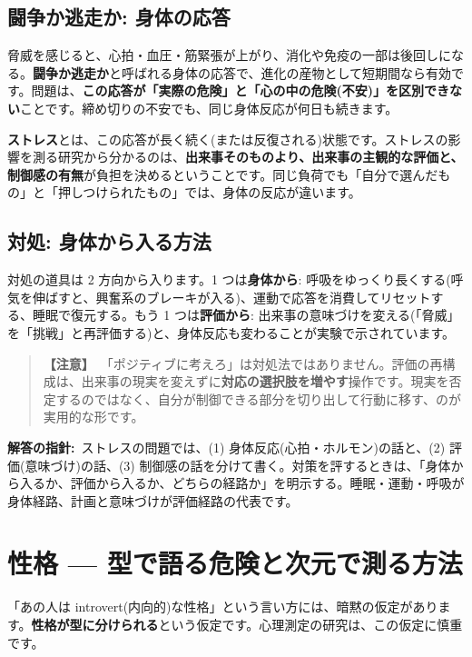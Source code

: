 \documentclass{article}
\begin{document}
\subsection{闘争か逃走か: 身体の応答}

脅威を感じると、心拍・血圧・筋緊張が上がり、消化や免疫の一部は後回しになる。\textbf{闘争か逃走か}と呼ばれる身体の応答で、進化の産物として短期間なら有効です。問題は、\textbf{この応答が「実際の危険」と「心の中の危険(不安)」を区別できない}ことです。締め切りの不安でも、同じ身体反応が何日も続きます。

\textbf{ストレス}とは、この応答が長く続く(または反復される)状態です。ストレスの影響を測る研究から分かるのは、\textbf{出来事そのものより、出来事の主観的な評価と、制御感の有無}が負担を決めるということです。同じ負荷でも「自分で選んだもの」と「押しつけられたもの」では、身体の反応が違います。

\subsection{対処: 身体から入る方法}

対処の道具は 2 方向から入ります。1 つは\textbf{身体から}: 呼吸をゆっくり長くする(呼気を伸ばすと、興奮系のブレーキが入る)、運動で応答を消費してリセットする、睡眠で復元する。もう 1 つは\textbf{評価から}: 出来事の意味づけを変える(「脅威」を「挑戦」と再評価する)と、身体反応も変わることが実験で示されています。

\begin{quote}
\textbf{【注意】}\ 「ポジティブに考えろ」は対処法ではありません。評価の再構成は、出来事の現実を変えずに\textbf{対応の選択肢を増やす}操作です。現実を否定するのではなく、自分が制御できる部分を切り出して行動に移す、のが実用的な形です。
\end{quote}

\textbf{解答の指針:}\ ストレスの問題では、(1) 身体反応(心拍・ホルモン)の話と、(2) 評価(意味づけ)の話、(3) 制御感の話を分けて書く。対策を評するときは、「身体から入るか、評価から入るか、どちらの経路か」を明示する。睡眠・運動・呼吸が身体経路、計画と意味づけが評価経路の代表です。

\section{性格 — 型で語る危険と次元で測る方法}

「あの人は introvert(内向的)な性格」という言い方には、暗黙の仮定があります。\textbf{性格が型に分けられる}という仮定です。心理測定の研究は、この仮定に慎重です。
\end{document}
